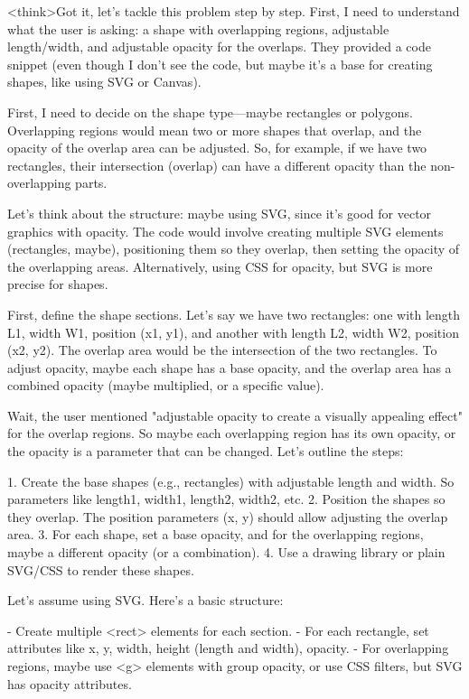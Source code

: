 <think>Got it, let's tackle this problem step by step. First, I need to understand what the user is asking: a shape with overlapping regions, adjustable length/width, and adjustable opacity for the overlaps. They provided a code snippet (even though I don't see the code, but maybe it's a base for creating shapes, like using SVG or Canvas). 

First, I need to decide on the shape type—maybe rectangles or polygons. Overlapping regions would mean two or more shapes that overlap, and the opacity of the overlap area can be adjusted. So, for example, if we have two rectangles, their intersection (overlap) can have a different opacity than the non-overlapping parts.

Let's think about the structure: maybe using SVG, since it's good for vector graphics with opacity. The code would involve creating multiple SVG elements (rectangles, maybe), positioning them so they overlap, then setting the opacity of the overlapping areas. Alternatively, using CSS for opacity, but SVG is more precise for shapes.

First, define the shape sections. Let's say we have two rectangles: one with length L1, width W1, position (x1, y1), and another with length L2, width W2, position (x2, y2). The overlap area would be the intersection of the two rectangles. To adjust opacity, maybe each shape has a base opacity, and the overlap area has a combined opacity (maybe multiplied, or a specific value).

Wait, the user mentioned "adjustable opacity to create a visually appealing effect" for the overlap regions. So maybe each overlapping region has its own opacity, or the opacity is a parameter that can be changed. Let's outline the steps:

1. Create the base shapes (e.g., rectangles) with adjustable length and width. So parameters like length1, width1, length2, width2, etc.
2. Position the shapes so they overlap. The position parameters (x, y) should allow adjusting the overlap area.
3. For each shape, set a base opacity, and for the overlapping regions, maybe a different opacity (or a combination).
4. Use a drawing library or plain SVG/CSS to render these shapes.

Let's assume using SVG. Here's a basic structure:

- Create multiple <rect> elements for each section.
- For each rectangle, set attributes like x, y, width, height (length and width), opacity.
- For overlapping regions, maybe use <g> elements with group opacity, or use CSS filters, but SVG has opacity attributes.

